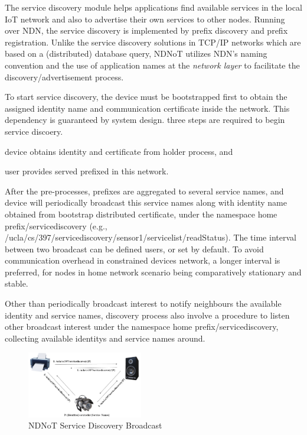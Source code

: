 \documentclass[sigconf]{acmart}
\begin{document}
The service discovery module helps applications find available services in the local IoT network and also to advertise their own services to other nodes.
Running over NDN, the service discovery is implemented by prefix discovery and prefix registration.
Unlike the service discovery solutions in TCP/IP networks which are based on a (distributed) database query,
NDNoT utilizes NDN's naming convention and the use of application names at the \emph{network layer} to facilitate the discovery/advertisement process.

To start service discovery, the device must be bootstrapped first to obtain the assigned identity name and communication certificate inside the network.
This dependency is guaranteed by system design. three steps are required to begin service discoery. 
\begin{enumerate*} [label=(\roman*)]
	\item device obtains identity and certificate from holder process,
	and
	\item user provides served prefixed in this network.
\end{enumerate*}

After the pre-processes, prefixes are aggregated to several service names, and device will periodically broadcast this service names 
along with identity name obtained from bootstrap distributed certificate, under the namespace {home prefix}/servicediscovery
(e.g., /ucla/cs/397/servicediscovery/sensor1/servicelist/readStatus). The time interval between two broadcast can
be defined users, or set by default. To avoid communication overhead in constrained devices network, a longer interval is preferred, for nodes in
home network scenario being comparatively stationary and stable.  

Other than periodically broadcast interest to notify neighbours the available identity and service names, discovery process also involve a procedure 
to listen other broadcast interest under the namespace {home prefix}/servicediscovery, collecting available identitys and service names around.

\begin{figure}[h]
	\vspace{-0.1cm}
	\centering
	\includegraphics[width=0.45\textwidth]{figures/service-discovery}
	\caption{NDNoT Service Discovery Broadcast}
	\vspace{-0.1cm}
	\label{fig:servicediscovery-broadcast}
\end{figure}
\end{document}
